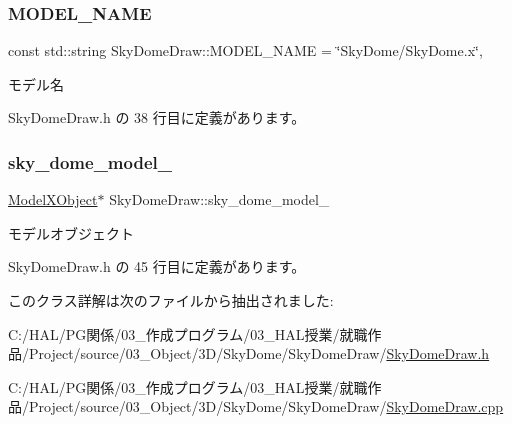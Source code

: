 \subsubsection{\texorpdfstring{M\+O\+D\+E\+L\+\_\+\+N\+A\+ME}{MODEL\_NAME}}
{\footnotesize\ttfamily const std\+::string Sky\+Dome\+Draw\+::\+M\+O\+D\+E\+L\+\_\+\+N\+A\+ME = \char`\"{}Sky\+Dome/Sky\+Dome.\+x\char`\"{}\hspace{0.3cm}{\ttfamily [static]}, {\ttfamily [private]}}



モデル名 



 Sky\+Dome\+Draw.\+h の 38 行目に定義があります。

\mbox{\label{class_sky_dome_draw_a2453fb04f979443c61acc10eafa183aa}} 
\subsubsection{\texorpdfstring{sky\+\_\+dome\+\_\+model\+\_\+}{sky\_dome\_model\_}}
{\footnotesize\ttfamily \mbox{\hyperlink{class_model_x_object}{Model\+X\+Object}}$\ast$ Sky\+Dome\+Draw\+::sky\+\_\+dome\+\_\+model\+\_\+\hspace{0.3cm}{\ttfamily [private]}}



モデルオブジェクト 



 Sky\+Dome\+Draw.\+h の 45 行目に定義があります。



このクラス詳解は次のファイルから抽出されました\+:\begin{DoxyCompactItemize}
\item 
C\+:/\+H\+A\+L/\+P\+G関係/03\+\_\+作成プログラム/03\+\_\+\+H\+A\+L授業/就職作品/\+Project/source/03\+\_\+\+Object/3\+D/\+Sky\+Dome/\+Sky\+Dome\+Draw/\mbox{\hyperlink{_sky_dome_draw_8h}{Sky\+Dome\+Draw.\+h}}\item 
C\+:/\+H\+A\+L/\+P\+G関係/03\+\_\+作成プログラム/03\+\_\+\+H\+A\+L授業/就職作品/\+Project/source/03\+\_\+\+Object/3\+D/\+Sky\+Dome/\+Sky\+Dome\+Draw/\mbox{\hyperlink{_sky_dome_draw_8cpp}{Sky\+Dome\+Draw.\+cpp}}\end{DoxyCompactItemize}
